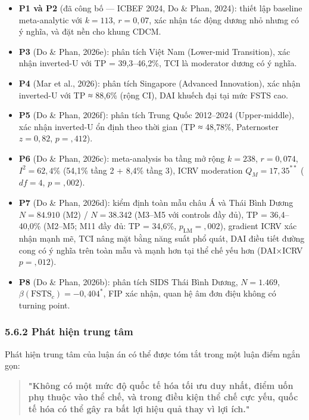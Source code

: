 \documentclass[12pt,a4paper]{article}
\begin{document}
\begin{itemize}
\item
  \textbf{P1 và P2} (đã công bố --- ICBEF 2024, Do \& Phan, 2024): thiết
  lập baseline meta-analytic với \(k = 113\), \(r = 0{,}07\), xác nhận
  tác động dương nhỏ nhưng có ý nghĩa, và đặt nền cho khung CDCM.
\item
  \textbf{P3} (Do \& Phan, 2026e): phân tích Việt Nam (Lower-mid
  Transition), xác nhận inverted-U với TP = 39,3--46,2\%, TCI là
  moderator dương có ý nghĩa.
\item
  \textbf{P4} (Mar et al., 2026): phân tích Singapore (Advanced
  Innovation), xác nhận inverted-U với TP ≈ 88,6\% (rộng CI), DAI khuếch
  đại tại mức FSTS cao.
\item
  \textbf{P5} (Do \& Phan, 2026f): phân tích Trung Quốc 2012--2024
  (Upper-middle), xác nhận inverted-U ổn định theo thời gian (TP ≈
  48,78\%, Paternoster \(z = 0{,}82\), \(p = {,}412\)).
\item
  \textbf{P6} (Do \& Phan, 2026c): meta-analysis ba tầng mở rộng
  \(k = 238\), \(r = 0{,}074\), \(I^2 = 62{,}4\%\) (54,1\% tầng 2 +
  8,4\% tầng 3), ICRV moderation \(Q_M = 17{,}35^{**}\) (\(df = 4\),
  \(p = {,}002\)).
\item
  \textbf{P7} (Do \& Phan, 2026d): kiểm định toàn mẫu châu Á và Thái
  Bình Dương \(N = 84.910\) (M2) / \(N = 38.342\) (M3--M5 với controls
  đầy đủ), TP = 36,4--40,0\% (M2--M5; M11 đầy đủ: TP = 34,6\%,
  \(p_\text{LM} = {,}002\)), gradient ICRV xác nhận mạnh mẽ, TCI nâng
  mặt bằng năng suất phổ quát, DAI điều tiết đường cong có ý nghĩa trên
  toàn mẫu và mạnh hơn tại thể chế yếu hơn (DAI×ICRV \(p = {,}012\)).
\item
  \textbf{P8} (Do \& Phan, 2026b): phân tích SIDS Thái Bình Dương,
  \(N = 1.469\), \(\beta(\text{FSTS}_c) = -0{,}404^{*}\), FIP xác nhận,
  quan hệ âm đơn điệu không có turning point.
\end{itemize}

\hypertarget{562-phuxe1t-hiux1ec7n-trung-tuxe2m}{%
\subsubsection{5.6.2 Phát hiện trung
tâm}\label{562-phuxe1t-hiux1ec7n-trung-tuxe2m}}

Phát hiện trung tâm của luận án có thể được tóm tắt trong một luận điểm
ngắn gọn:

\begin{quote}
\textbf{"Không có một mức độ quốc tế hóa tối ưu duy nhất, điểm uốn phụ
thuộc vào thể chế, và trong điều kiện thể chế cực yếu, quốc tế hóa có
thể gây ra bất lợi hiệu quả thay vì lợi ích."}
\end{quote}
\end{document}

